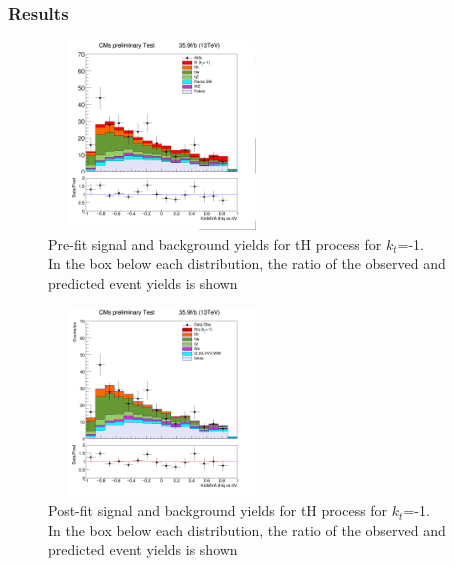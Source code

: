 \documentclass[11pt]{beamer}
\begin{document}
\begin{frame}
\frametitle{Results}
\begin{minipage}{0.5\textwidth}
	\begin{center}
		\begin{figure}
			\includegraphics[width=6cm,height=5cm]{figures/kin-kt-1.png}
			\caption*{\tiny{Pre-fit signal and background yields for tH process for $k_t$=-1.\\
					 In the box below each distribution, the ratio of the observed and predicted event yields is shown}}
		\end{figure}
	\end{center}
\end{minipage}\hfill
\begin{minipage}{0.5\textwidth}
	\begin{center}
		\begin{figure}
			\includegraphics[width=6cm,height=5cm]{figures/simple-kt-1.png}
			\caption*{\tiny{Post-fit signal and background yields for tH process for $k_t$=-1. \\ In the
					box below each distribution, the ratio of the observed and predicted event yields is shown}}
		\end{figure}
	\end{center}
\end{minipage}
\end{frame}
\end{document}
